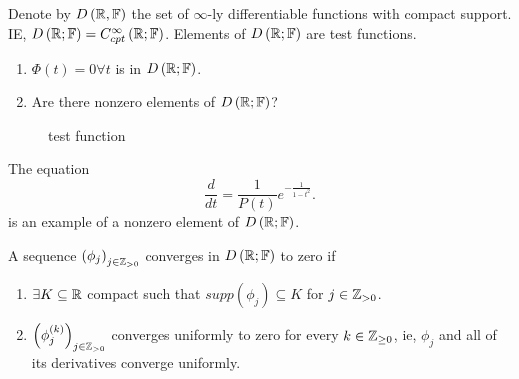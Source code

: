 \begin{definition}
	Denote by $D\left( \mathbb{R}, \mathbb{F} \right) $ the set of $\infty$-ly differentiable functions with compact support. IE, $D\left( \mathbb{R}; \mathbb{F} \right) = C^{\infty}_{cpt}\left( \mathbb{R}; \mathbb{F} \right) $. Elements of $D\left( \mathbb{R}; \mathbb{F} \right) $ are test functions. 
\end{definition}

\begin{example}
	\begin{enumerate}
		\item $\Phi\left( t \right) = 0 \forall  t $ is in $D\left( \mathbb{R};\mathbb{F} \right) $.
		\item Are there nonzero elements of $D\left( \mathbb{R}; \mathbb{F} \right) $?
			
	\end{enumerate}
\begin{figure}[ht]
    \centering
    \caption{test function}
    \label{fig:test-function}
\end{figure}

The equation
\[
	\frac{d}{dt} = \frac{1}{P\left( t \right) } e ^{-\frac{1}{1 - t^2}}
.\] 	
is an example of a nonzero element of $D\left( \mathbb{R};\mathbb{F} \right) $. 
\end{example}

\begin{definition}
	A sequence $\left( \phi_{j} \right) _{j \in \mathbb{Z}_{>0}}$ converges in $D\left( \mathbb{R}; \mathbb{F} \right) $ to zero if 
	\begin{enumerate}
		\item $\exists K \subseteq \mathbb{R} $ compact such that $supp\left( \phi_{j} \right) \subseteq K$ for $j \in  \mathbb{Z}_{>0}$. 
		\item $\left( \phi_{j}^{\left( k \right) } \right) _{j \in  \mathbb{Z} _{>0}}$ converges uniformly to zero for every $k \in  \mathbb{Z}_{\ge 0}$, ie, $\phi_{j}$ and all of its derivatives converge uniformly. 
	\end{enumerate}
\end{definition}

